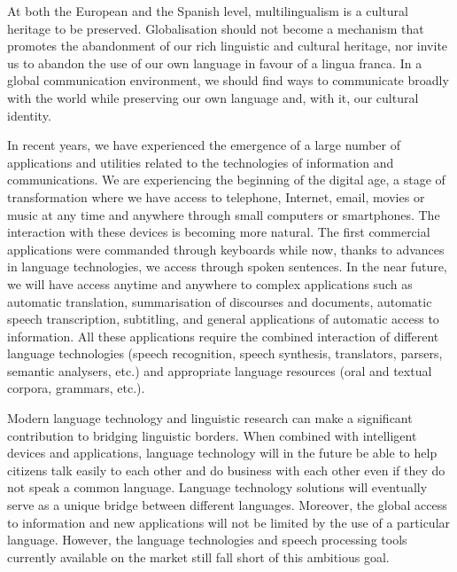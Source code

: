 \begin{multicols}{2}
At both the European and the Spanish level, multilingualism is a cultural heritage to be preserved. Globalisation should not become a mechanism that promotes the abandonment of our rich linguistic and cultural heritage, nor invite us to abandon the use of our own language in favour of a lingua franca. In a global communication environment, we should find ways to communicate broadly with the world while preserving our own language and, with it, our cultural identity.

In recent years, we have experienced the emergence of a large number of applications and utilities related to the technologies of information and communications. We are experiencing the beginning of the digital age, a stage of transformation where we have access to telephone, Internet, email, movies or music at any time and anywhere through small computers or smartphones. The interaction with these devices is becoming more natural. The first commercial applications were commanded through keyboards while now, thanks to advances in language technologies, we access through spoken sentences. In the near future, we will have access anytime and anywhere to complex applications such as automatic translation, summarisation of discourses and documents, automatic speech transcription, subtitling, and general applications of automatic access to information. All these applications require the combined interaction of different language technologies (speech recognition, speech synthesis, translators, parsers, semantic analysers, etc.) and appropriate language resources (oral and textual corpora, grammars, etc.).


Modern language technology and linguistic research can make a significant contribution to bridging linguistic borders. When combined with intelligent devices and applications, language technology will in the future be able to help citizens talk easily to each other and do business with each other even if they do not speak a common language. Language technology solutions will eventually serve as a unique bridge between different languages. Moreover, the global access to information and new applications will not be limited by the use of a particular language. However, the language technologies and speech processing tools currently available on the market still fall short of this ambitious goal. 


\end{multicols}
